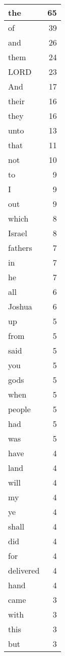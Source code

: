 \begin{center}
\begin{longtable}{l|r}
\hline \hline
\endlastfoot
the & 65 \\ \hline
of & 39 \\ \hline
and & 26 \\ \hline
them & 24 \\ \hline
LORD & 23 \\ \hline
And & 17 \\ \hline
their & 16 \\ \hline
they & 16 \\ \hline
unto & 13 \\ \hline
that & 11 \\ \hline
not & 10 \\ \hline
to & 9 \\ \hline
I & 9 \\ \hline
out & 9 \\ \hline
which & 8 \\ \hline
Israel & 8 \\ \hline
fathers & 7 \\ \hline
in & 7 \\ \hline
he & 7 \\ \hline
all & 6 \\ \hline
Joshua & 6 \\ \hline
up & 5 \\ \hline
from & 5 \\ \hline
said & 5 \\ \hline
you & 5 \\ \hline
gods & 5 \\ \hline
when & 5 \\ \hline
people & 5 \\ \hline
had & 5 \\ \hline
was & 5 \\ \hline
have & 4 \\ \hline
land & 4 \\ \hline
will & 4 \\ \hline
my & 4 \\ \hline
ye & 4 \\ \hline
shall & 4 \\ \hline
did & 4 \\ \hline
for & 4 \\ \hline
delivered & 4 \\ \hline
hand & 4 \\ \hline
came & 3 \\ \hline
with & 3 \\ \hline
this & 3 \\ \hline
but & 3 \\ \hline

\end{longtable}
\end{center}
